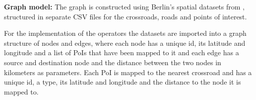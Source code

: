 \textbf{Graph model:}
The graph is constructed using Berlin's spatial datasets from \cite{datasets}, structured in separate CSV files for the crossroads, roads and points of interest.

For the implementation of the operators the datasets are imported into a graph structure of nodes and edges, where each node has a unique id, its latitude and longitude and a list of PoIs that have been mapped to it and each edge has a source and destination node and the distance between the two nodes in kilometers as parameters. Each PoI is mapped to the nearest crossroad and has a unique id, a type, its latitude and longitude and the distance to the node it is mapped to. \newline

